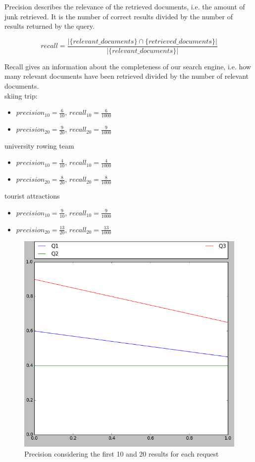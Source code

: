 \begin{itemize}
Precision describes the relevance of the retrieved documents, i.e. the amount of junk retrieved. It is the number of correct results divided by the number of results returned by the query.

\begin{equation}
recall = \frac{|\{relevant\_documents\}\cap\{retrieved\_documents\}|}{|\{relevant\_documents\}|}
\end{equation}

Recall gives an information about the completeness of our search engine, i.e. how many relevant documents have been retrieved divided by the number of relevant documents.\\

skiing trip:
\begin{itemize}
\item $precision_{10} = \frac{6}{10}$, $recall_{10} = \frac{6}{1000}$
\item $precision_{20} = \frac{9}{20}$, $recall_{20} = \frac{9}{1000}$
\end{itemize}

university rowing team
\begin{itemize}
\item $precision_{10} = \frac{4}{10}$, $recall_{10} = \frac{4}{1000}$
\item $precision_{20} = \frac{8}{20}$, $recall_{20} = \frac{8}{1000}$
\end{itemize}

tourist attractions
\begin{itemize}
\item $precision_{10} = \frac{9}{10}$, $recall_{10} = \frac{9}{1000}$
\item $precision_{20} = \frac{13}{20}$, $recall_{20} = \frac{13}{1000}$
\end{itemize}

\begin{figure}[H]
\centering
\includegraphics[width=0.6\linewidth]{img/precision.png}
\caption{Precision considering the first 10 and 20 results for each request}
\end{figure}


\end{itemize}
